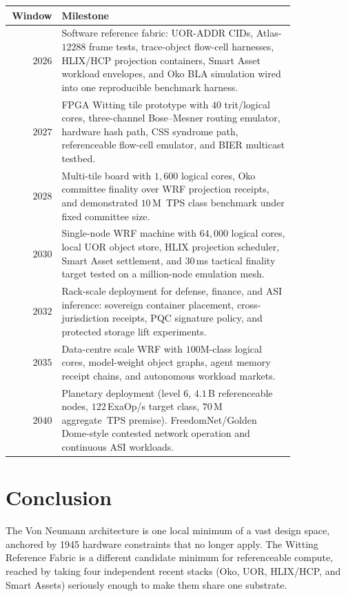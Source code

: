 \documentclass[11pt,letterpaper]{article}
\theoremstyle{remark}
\begin{document}
\begin{center}
\renewcommand{\arraystretch}{1.18}
\begin{tabular}{r>{\raggedright\arraybackslash}p{0.82\linewidth}}
\toprule
\textbf{Window} & \textbf{Milestone} \\
\midrule
$2026$ & Software reference fabric: UOR-ADDR CIDs, Atlas-$12288$ frame tests, trace-object
flow-cell harnesses, HLIX/HCP projection containers, Smart Asset workload envelopes, and
Oko BLA simulation wired into one reproducible benchmark harness.\\
$2027$ & FPGA Witting tile prototype with $40$ trit/logical cores, three-channel
Bose--Mesner routing emulator, hardware hash path, CSS syndrome path, referenceable
flow-cell emulator, and BIER multicast testbed.\\
$2028$ & Multi-tile board with $1{,}600$ logical cores, Oko committee finality over WRF
projection receipts, and demonstrated $10$\,M~TPS class benchmark under fixed committee
size.\\
$2030$ & Single-node WRF machine with $64{,}000$ logical cores, local UOR object store,
HLIX projection scheduler, Smart Asset settlement, and $30$\,ms tactical finality target
tested on a million-node emulation mesh.\\
$2032$ & Rack-scale deployment for defense, finance, and ASI inference: sovereign
container placement, cross-jurisdiction receipts, PQC signature policy, and protected
storage lift experiments.\\
$2035$ & Data-centre scale WRF with $100$M-class logical cores, model-weight object
graphs, agent memory receipt chains, and autonomous workload markets.\\
$2040$ & Planetary deployment (level 6, $4.1$\,B referenceable nodes, $122$\,ExaOp/s
target class, $70$\,M aggregate~TPS premise). FreedomNet/Golden Dome-style contested
network operation and continuous ASI workloads.\\
\bottomrule
\end{tabular}
\end{center}

\section{Conclusion}

The Von Neumann architecture is one local minimum of a vast design space, anchored by
1945 hardware constraints that no longer apply. The Witting Reference Fabric is a
different candidate minimum for referenceable compute, reached by taking four independent
recent stacks (Oko, UOR, HLIX/HCP, and Smart Assets) seriously enough to make them share
one substrate.
\end{document}
